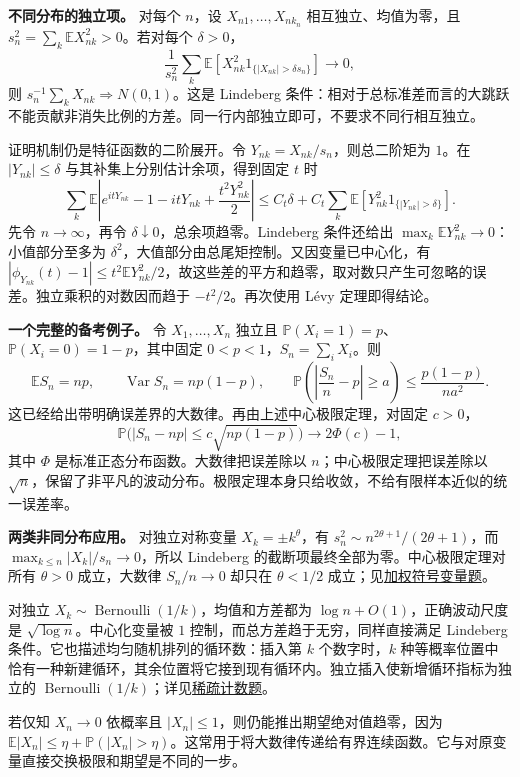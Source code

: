 \documentclass[UTF8,12pt,a4paper,fontset=fandol]{ctexbook}
\begin{document}
\textbf{不同分布的独立项。} 对每个 $n$，设 $X_{n1},\ldots,X_{nk_n}$ 相互独立、均值为零，且 $s_n^2=\sum_k\mathbb EX_{nk}^2>0$。若对每个 $\delta>0$，
\[
\frac1{s_n^2}\sum_k\mathbb E\!\left[X_{nk}^2
1_{\{|X_{nk}|>\delta s_n\}}\right]\longrightarrow0,
\]
则 $s_n^{-1}\sum_kX_{nk}\Rightarrow N(0,1)$。这是 Lindeberg 条件：相对于总标准差而言的大跳跃不能贡献非消失比例的方差。同一行内部独立即可，不要求不同行相互独立。

证明机制仍是特征函数的二阶展开。令 $Y_{nk}=X_{nk}/s_n$，则总二阶矩为 $1$。在 $|Y_{nk}|\le\delta$ 与其补集上分别估计余项，得到固定 $t$ 时
\[
\sum_k\mathbb E\left|e^{itY_{nk}}-1-itY_{nk}
+\frac{t^2Y_{nk}^2}{2}\right|
\le C_t\delta+C_t\sum_k\mathbb E[Y_{nk}^2 1_{\{|Y_{nk}|>\delta\}}].
\]
先令 $n\to\infty$，再令 $\delta\downarrow0$，总余项趋零。Lindeberg 条件还给出 $\max_k\mathbb EY_{nk}^2\to0$：小值部分至多为 $\delta^2$，大值部分由总尾矩控制。又因变量已中心化，有 $|\phi_{Y_{nk}}(t)-1|\le t^2\mathbb EY_{nk}^2/2$，故这些差的平方和趋零，取对数只产生可忽略的误差。独立乘积的对数因而趋于 $-t^2/2$。再次使用 Lévy 定理即得结论。

\textbf{一个完整的备考例子。} 令 $X_1,\ldots,X_n$ 独立且 $\mathbb P(X_i=1)=p$、$\mathbb P(X_i=0)=1-p$，其中固定 $0<p<1$，$S_n=\sum_iX_i$。则
\[
\mathbb ES_n=np,\qquad \operatorname{Var}S_n=np(1-p),
\qquad
\mathbb P\!\left(\left|\frac{S_n}{n}-p\right|\ge a\right)
\le\frac{p(1-p)}{na^2}.
\]
这已经给出带明确误差界的大数律。再由上述中心极限定理，对固定 $c>0$，
\[
\mathbb P\bigl(|S_n-np|\le c\sqrt{np(1-p)}\bigr)
\longrightarrow2\Phi(c)-1,
\]
其中 $\Phi$ 是标准正态分布函数。大数律把误差除以 $n$；中心极限定理把误差除以 $\sqrt n$，保留了非平凡的波动分布。极限定理本身只给收敛，不给有限样本近似的统一误差率。

\textbf{两类非同分布应用。} 对独立对称变量 $X_k=\pm k^\theta$，有 $s_n^2\sim n^{2\theta+1}/(2\theta+1)$，而 $\max_{k\le n}|X_k|/s_n\to0$，所以 Lindeberg 的截断项最终全部为零。中心极限定理对所有 $\theta>0$ 成立，大数律 $S_n/n\to0$ 却只在 $\theta<1/2$ 成立；见\hyperref[pr:fin10-hi:13]{加权符号变量题}。

对独立 $X_k\sim\operatorname{Bernoulli}(1/k)$，均值和方差都为 $\log n+O(1)$，正确波动尺度是 $\sqrt{\log n}$。中心化变量被 $1$ 控制，而总方差趋于无穷，同样直接满足 Lindeberg 条件。它也描述均匀随机排列的循环数：插入第 $k$ 个数字时，$k$ 种等概率位置中恰有一种新建循环，其余位置将它接到现有循环内。独立插入使新增循环指标为独立的 $\operatorname{Bernoulli}(1/k)$；详见\hyperref[pr:fin12-high:12]{稀疏计数题}。

若仅知 $X_n\to0$ 依概率且 $|X_n|\le1$，则仍能推出期望绝对值趋零，因为 $\mathbb E|X_n|\le\eta+\mathbb P(|X_n|>\eta)$。这常用于将大数律传递给有界连续函数。它与对原变量直接交换极限和期望是不同的一步。
\end{document}
